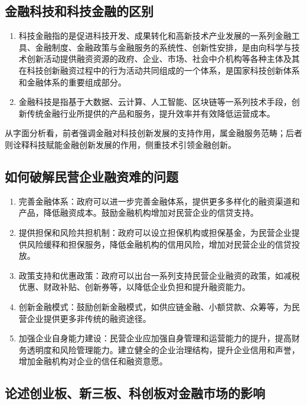 \documentclass{article}
\begin{document}
\subsection{金融科技和科技金融的区别}

\begin{enumerate}
	\item 科技金融指的是促进科技开发、成果转化和高新技术产业发展的一系列金融工具、金融制度、金融政策与金融服务的系统性、创新性安排，是由向科学与技术创新活动提供融资资源的政府、企业、市场、社会中介机构等各种主体及其在科技创新融资过程中的行为活动共同组成的一个体系，是国家科技创新体系和金融体系的重要组成部分。
	\item 金融科技是指基于大数据、云计算、人工智能、区块链等一系列技术手段，创新传统金融行业所提供的产品和服务，提升效率并有效降低运营成本。
\end{enumerate}

从字面分析看，前者强调金融对科技创新发展的支持作用，属金融服务范畴；后者则诠释科技赋能金融创新发展的作用，侧重技术引领金融创新。

\subsection{如何破解民营企业融资难的问题}
\begin{enumerate}
	\item 完善金融体系：政府可以进一步完善金融体系，提供更多多样化的融资渠道和产品，降低融资成本。鼓励金融机构增加对民营企业的信贷支持。
	\item 提供担保和风险共担机制：政府可以设立担保机构或担保基金，为民营企业提供风险缓释和担保服务，降低金融机构的信用风险，增加对民营企业的信贷投放。
	\item 政策支持和优惠政策：政府可以出台一系列支持民营企业融资的政策，如减税优惠、财政补贴、创新券等，以降低企业负担和提升融资能力。
	\item 创新金融模式：鼓励创新金融模式，如供应链金融、小额贷款、众筹等，为民营企业提供更多非传统的融资途径。
	\item 加强企业自身能力建设：民营企业应加强自身管理和运营能力的提升，提高财务透明度和风险管理能力。建立健全的企业治理结构，提升企业信用和声誉，增加金融机构对企业的信任和融资意愿。
\end{enumerate}

\subsection{论述创业板、新三板、科创板对金融市场的影响}
\end{document}
